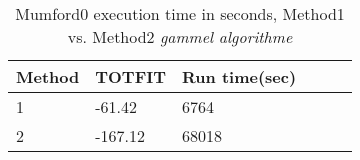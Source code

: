 \begin{table}[H]
    \centering
    \begin{tabular}{|l|l|l|l|l|l|}
        \hline
        Method & TOTFIT & Run time(sec) \\
        \hline
        1 & -61.42 & 6764 \\
        2 & -167.12 & 68018 \\
        \hline
    \end{tabular}
    \caption{Mumford0 execution time in seconds, Method1 vs. Method2 \emph{\color{blue} gammel algorithme}}
    \label{table:results_mumford}
\end{table}

